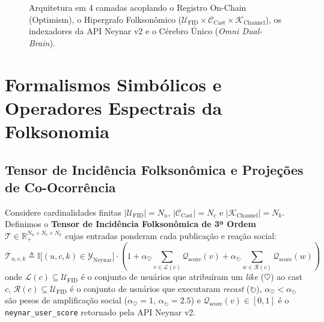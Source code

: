 \documentclass[11pt,a4paper]{article}
\begin{document}
\begin{figure}[htbp]
\caption{Arquitetura em 4 camadas acoplando o Registro On-Chain (Optimism), o Hipergrafo Folksonômico ($\mathcal{U}_{\text{FID}} \times \mathcal{C}_{\text{Cast}} \times \mathcal{K}_{\text{Channel}}$), os indexadores da API Neynar v2 e o Cérebro Único (\emph{Omni Dual-Brain}).}
\label{fig:hypergraph}
\end{figure}

\section{Formalismos Simbólicos e Operadores Espectrais da Folksonomia}

\subsection{Tensor de Incidência Folksonômica e Projeções de Co-Ocorrência}

Considere cardinalidades finitas $|\mathcal{U}_{\text{FID}}| = N_u$, $|\mathcal{C}_{\text{Cast}}| = N_c$ e $|\mathcal{K}_{\text{Channel}}| = N_k$. Definimos o \textbf{Tensor de Incidência Folksonômica de 3ª Ordem} $\boldsymbol{\mathcal{T}} \in \mathbb{R}_+^{N_u \times N_c \times N_k}$ cujas entradas ponderam cada publicação e reação social:
\begin{equation}
  \mathcal{T}_{u,c,k} \triangleq \mathbb{I}\big[(u, c, k) \in \mathcal{Y}_{\text{Neynar}}\big] \cdot \left( 1 + \alpha_{\heartsuit} \sum_{v \in \mathcal{L}(c)} \mathcal{Q}_{\text{score}}(v) + \alpha_{\circlearrowright} \sum_{w \in \mathcal{R}(c)} \mathcal{Q}_{\text{score}}(w) \right)
\end{equation}
onde $\mathcal{L}(c) \subseteq \mathcal{U}_{\text{FID}}$ é o conjunto de usuários que atribuíram um \emph{like} ($\heartsuit$) ao cast $c$, $\mathcal{R}(c) \subseteq \mathcal{U}_{\text{FID}}$ é o conjunto de usuários que executaram \emph{recast} ($\circlearrowright$), $\alpha_{\heartsuit} < \alpha_{\circlearrowright}$ são pesos de amplificação social ($\alpha_{\heartsuit}=1, \, \alpha_{\circlearrowright}=2.5$) e $\mathcal{Q}_{\text{score}}(v) \in [0,1]$ é o \texttt{neynar\_user\_score} retornado pela API Neynar v2.
\end{document}
